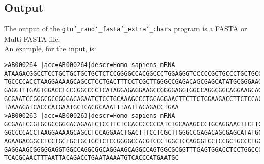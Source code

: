\subsection*{Output}
The output of the \texttt{gto\char`_rand\char`_fasta\char`_extra\char`_chars} program is a FASTA or Multi-FASTA file.\\
An example, for the input, is:
\begin{lstlisting}
>AB000264 |acc=AB000264|descr=Homo sapiens mRNA 
ATAAGACGGCCTCCTGCTGCTGCTGCTCTCCGGGGCCACGGCCCTGGAGGGTCCCCCGCTGCCCTGCTGCCATTGTCCCC
TGCCCCACCTAAGGAAAAGCAGCCTCCTGACTTTCCTCGCTTGGGCCGAGACAGCGAGCATATGCGGGAAGCGGCAGGAA
GAGGTTTGAGTGGACCTCCCGGCCCCTCATAGGAGAGGAAGCCGGGGAGGTGGCCAGGCGGCAGGAAGCAGGCCAGTGTC
GCGAATCCGGGCGCCGGGACAGAATCTCCTGCAAAGCCCTGCAGGAACTTCTTCTGGAAGACCTTCTCCACCCCCCCTTG
TAAAAGATCACCCATGAATGCTCACGCAAATTTAATTACAGACCTGAA
>AB000263 |acc=AB000263|descr=Homo sapiens mRNA 
GCGAATCCGTGCGCCGGGACAGAATCTCCTTCTCCACCCCCCCATCTGCAAAGCCCTGCAGGAACTTCTTCTGGAAGACC
GGCCCCACCTAAGGAAAAGCAGCCTCCAGGAACTGACTTTCCTCGCTTGGGCCGAGACAGCGAGCATATGCGGGAAGCGG
AGAAGACGGCCTCCTGCTGCTGCTGCTCTCCGGGGCCACGTCCCTGGCTCCAGGGTCCTCCGCTGCCCTGCTGCCATTGC
GAGGAAGCGGGGGAGGTGGCCAGGCGGCAGGAAGCAGGCCAGTGGCGCGGTTTGAGTGGACCTCCTGGCCCCTCATAGGA
TCACGCAACTTTAATTACAGACCTGAATAAAATGTCACCCATGAATGC
\end{lstlisting}